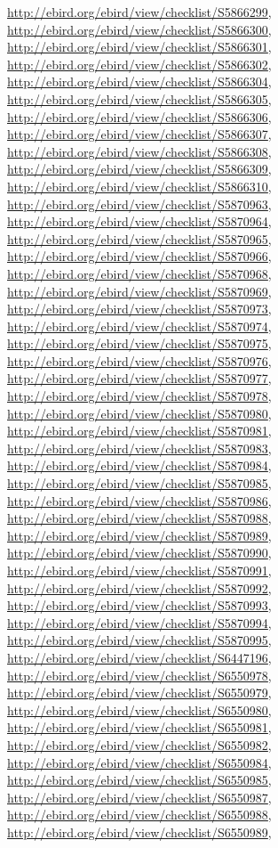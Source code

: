 \documentclass[9pt, article]{memoir}
\begin{document}
\begin{multicols}{2}
\url{http://ebird.org/ebird/view/checklist/S5866299}, 
\url{http://ebird.org/ebird/view/checklist/S5866300}, 
\url{http://ebird.org/ebird/view/checklist/S5866301}, 
\url{http://ebird.org/ebird/view/checklist/S5866302}, 
\url{http://ebird.org/ebird/view/checklist/S5866304}, 
\url{http://ebird.org/ebird/view/checklist/S5866305}, 
\url{http://ebird.org/ebird/view/checklist/S5866306}, 
\url{http://ebird.org/ebird/view/checklist/S5866307}, 
\url{http://ebird.org/ebird/view/checklist/S5866308}, 
\url{http://ebird.org/ebird/view/checklist/S5866309}, 
\url{http://ebird.org/ebird/view/checklist/S5866310}, 
\url{http://ebird.org/ebird/view/checklist/S5870963}, 
\url{http://ebird.org/ebird/view/checklist/S5870964}, 
\url{http://ebird.org/ebird/view/checklist/S5870965}, 
\url{http://ebird.org/ebird/view/checklist/S5870966}, 
\url{http://ebird.org/ebird/view/checklist/S5870968}, 
\url{http://ebird.org/ebird/view/checklist/S5870969}, 
\url{http://ebird.org/ebird/view/checklist/S5870973}, 
\url{http://ebird.org/ebird/view/checklist/S5870974}, 
\url{http://ebird.org/ebird/view/checklist/S5870975}, 
\url{http://ebird.org/ebird/view/checklist/S5870976}, 
\url{http://ebird.org/ebird/view/checklist/S5870977}, 
\url{http://ebird.org/ebird/view/checklist/S5870978}, 
\url{http://ebird.org/ebird/view/checklist/S5870980}, 
\url{http://ebird.org/ebird/view/checklist/S5870981}, 
\url{http://ebird.org/ebird/view/checklist/S5870983}, 
\url{http://ebird.org/ebird/view/checklist/S5870984}, 
\url{http://ebird.org/ebird/view/checklist/S5870985}, 
\url{http://ebird.org/ebird/view/checklist/S5870986}, 
\url{http://ebird.org/ebird/view/checklist/S5870988}, 
\url{http://ebird.org/ebird/view/checklist/S5870989}, 
\url{http://ebird.org/ebird/view/checklist/S5870990}, 
\url{http://ebird.org/ebird/view/checklist/S5870991}, 
\url{http://ebird.org/ebird/view/checklist/S5870992}, 
\url{http://ebird.org/ebird/view/checklist/S5870993}, 
\url{http://ebird.org/ebird/view/checklist/S5870994}, 
\url{http://ebird.org/ebird/view/checklist/S5870995}, 
\url{http://ebird.org/ebird/view/checklist/S6447196}, 
\url{http://ebird.org/ebird/view/checklist/S6550978}, 
\url{http://ebird.org/ebird/view/checklist/S6550979}, 
\url{http://ebird.org/ebird/view/checklist/S6550980}, 
\url{http://ebird.org/ebird/view/checklist/S6550981}, 
\url{http://ebird.org/ebird/view/checklist/S6550982}, 
\url{http://ebird.org/ebird/view/checklist/S6550984}, 
\url{http://ebird.org/ebird/view/checklist/S6550985}, 
\url{http://ebird.org/ebird/view/checklist/S6550987}, 
\url{http://ebird.org/ebird/view/checklist/S6550988}, 
\url{http://ebird.org/ebird/view/checklist/S6550989}, 

\end{multicols}
\end{document}
